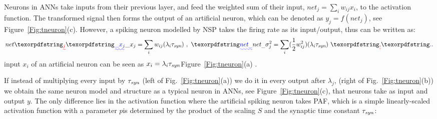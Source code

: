 	Neurons in ANNs take inputs from their previous layer, and feed the weighted sum of their input, $net_j = \sum_i w_{ij}x_i$, to the activation function.
	The transformed signal then forms the output of an artificial neuron, which can be denoted as $y_j=f(net_j)$, see Figure~\ref{Fig:tneuron}(c).
	However, a spiking neuron modelled by NSP takes the firing rate as its input/output, thus \DIFdelbegin {}\DIFdelend \DIFaddbegin {}\DIFaddend can be written as:
	\begin{equation}
	net\DIFdelbegin \DIFdel{_j }\DIFdelend \DIFaddbegin \DIFadd{\_x_{j} }\DIFaddend = \sum_i w_{ij}(\lambda_{i}\tau_{\textit{\textrm{syn}}})~,
	~\DIFaddbegin \DIFadd{net_\_}\DIFaddend \sigma^2_j= \sum_i (\frac{1}{2} w_{ij}^2)(\lambda_{i}\tau_{\textit{\textrm{syn}}})~\DIFdelbegin \DIFdel{, 
	}\DIFdelend \DIFaddbegin \DIFadd{.
	}\DIFaddend %
	\label{equ:mi_input}
	\end{equation}
	\DIFdelbegin {}\DIFdelend \DIFaddbegin {}\DIFaddend input $ x_i $ of an artificial \DIFaddbegin {}\DIFaddend neuron can be seen as $x_i=\lambda_{i}\tau_{\textit{\textrm{syn}}}$\DIFdelbegin {}\DIFdelend \DIFaddbegin {}\DIFaddend Figure~\ref{Fig:tneuron}(a) \DIFaddbegin {}\DIFaddend . 

	
	If instead of multiplying every input \DIFaddbegin {}\DIFaddend by $\tau_{\textit{\textrm{syn}}}$ (left of Fig.~\ref{Fig:tneuron}(a)) we do it in every output \DIFaddbegin {}\DIFaddend after $\lambda_j$, (right of Fig.~\ref{Fig:tneuron}(b)) we obtain the same neuron model and structure as a typical neuron in ANNs, see Figure~\ref{Fig:tneuron}(c), that neurons take \DIFdelbegin {}\DIFdelend \DIFaddbegin {}\DIFaddend as input and output \DIFaddbegin {}\DIFaddend $y$.
	The only difference lies in the activation function where the artificial spiking neuron takes PAF, which is a simple linearly-scaled activation function with a parameter $p$\DIFdelbegin {}\DIFdelend \DIFaddbegin {}\DIFaddend is determined by the product of the scaling \DIFdelbegin {}\DIFdelend \DIFaddbegin {}\DIFaddend $S$ and the synaptic time constant $\tau_{\textit{\textrm{syn}}}$:
	\DIFdelbegin %

